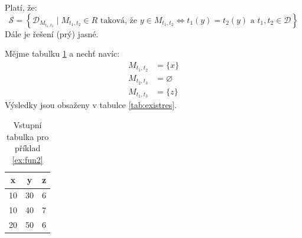 \begin{upproof}
Platí, že:
$$
\mathcal{S} = \left\{ \mathcal{D}_{M_{t_{1}, t_{2}}} \; | \; M_{t_{1}, t_{2}} \in R \text{ taková, že } y \in M_{t_{1}, t_{2}} \Leftrightarrow t_{1}(y) = t_{2}(y) \text{ a } t_{1}, t_{2} \in \mathcal{D} \right\}
$$
Dále je řešení (prý) jasné.
\end{upproof}
\begin{upexample}\label{ex:fun2}
Mějme tabulku \ref{tab:exist} a nechť navíc:
\begin{align*}
M_{t_{1}, t_{2}} &= \{ x \} \\
M_{t_{2}, t_{3}} &= \varnothing \\
M_{t_{1}, t_{3}} &= \{ z \}
\end{align*}
Výsledky jsou obsaženy v tabulce \ref{tab:existres}.
\end{upexample}
\begin{table}
\centering
\caption{Vstupní tabulka pro příklad \ref{ex:fun2}}\label{tab:exist}
\begin{tabular}{c c c}
x & y & z \\
\hline
10 & 30 & 6 \\
10 & 40 & 7 \\
20 & 50 & 6
\end{tabular}
\end{table}

